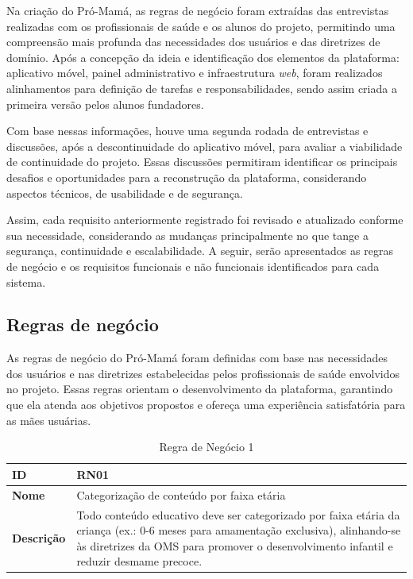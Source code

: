 Na criação do Pró-Mamá, as regras de negócio foram extraídas das entrevistas realizadas com os profissionais de saúde e os alunos do projeto, permitindo uma compreensão mais profunda das necessidades dos usuários e das diretrizes de domínio. Após a concepção da ideia e identificação dos elementos da plataforma: aplicativo móvel, painel administrativo e infraestrutura \emph{web}, foram realizados alinhamentos para definição de tarefas e responsabilidades, sendo assim criada a primeira versão pelos alunos fundadores.

Com base nessas informações, houve uma segunda rodada de entrevistas e discussões, após a descontinuidade do aplicativo móvel, para avaliar a viabilidade de continuidade do projeto. Essas discussões permitiram identificar os principais desafios e oportunidades para a reconstrução da plataforma, considerando aspectos técnicos, de usabilidade e de segurança.

Assim, cada requisito anteriormente registrado foi revisado e atualizado conforme sua necessidade, considerando as mudanças principalmente no que tange a segurança, continuidade e escalabilidade. A seguir, serão apresentados as regras de negócio e os requisitos funcionais e não funcionais identificados para cada sistema.

\subsection{Regras de negócio}

As regras de negócio do Pró-Mamá foram definidas com base nas necessidades dos usuários e nas diretrizes estabelecidas pelos profissionais de saúde envolvidos no projeto. Essas regras orientam o desenvolvimento da plataforma, garantindo que ela atenda aos objetivos propostos e ofereça uma experiência satisfatória para as mães usuárias.

\begin{table}[H]
\centering
\begin{tabular}{|l|p{12cm}|}
\hline
\textbf{ID} & RN01 \\
\hline
\textbf{Nome} & Categorização de conteúdo por faixa etária \\
\hline
\textbf{Descrição} & Todo conteúdo educativo deve ser categorizado por faixa etária da criança (ex.: 0-6 meses para amamentação exclusiva), alinhando-se às diretrizes da OMS para promover o desenvolvimento infantil e reduzir desmame precoce. \\
\hline
\end{tabular}
\caption[RN01 -- Categorização de conteúdo por faixa etária]{Regra de Negócio 1}
\label{tab:rn01}
\end{table}

